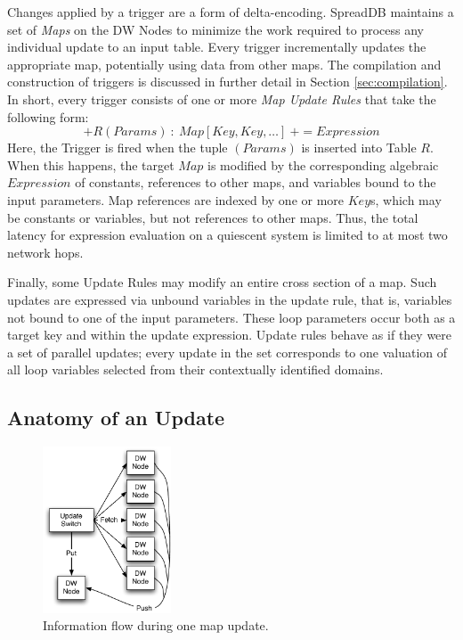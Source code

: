 \documentclass{sig-alternate}
\begin{document}
Changes applied by a trigger are a form of delta-encoding.  SpreadDB maintains a set of \textit{Maps} on the DW Nodes to minimize the work required to process any individual update to an input table.  Every trigger incrementally updates the appropriate map, potentially using data from other maps.  The compilation and construction of triggers is discussed in further detail in Section \ref{sec:compilation}.  In short, every trigger consists of one or more \textit{Map Update Rules} that take the following form:
$$+R(Params)\ :\ Map[Key, Key, \ldots]\ += Expression$$
Here, the Trigger is fired when the tuple $(Params)$ is inserted into Table $R$.  When this happens, the target $Map$ is modified by the corresponding algebraic $Expression$ of constants, references to other maps, and variables bound to the input parameters.  Map references are indexed by one or more $Key$s, which may be constants or variables, but not references to other maps.  Thus, the total latency for expression evaluation on a quiescent system is limited to at most two network hops.  

Finally, some Update Rules may modify an entire cross section of a map.  Such updates are expressed via unbound variables in the update rule, that is, variables not bound to one of the input parameters.  These loop parameters occur both as a target key and within the update expression.  Update rules behave as if they were a set of parallel updates; every update in the set corresponds to one valuation of all loop variables selected from their contextually identified domains.  

\subsection{Anatomy of an Update}

\begin{figure}
\begin{center}
\includegraphics[width=1.5in]{images/UpdateStep.pdf}
\caption{Information flow during one map update.}
\label{fig:updatestep}
\end{center}
\end{figure}
\end{document}
